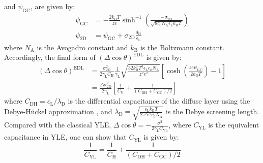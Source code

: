 and \(\psi_{\mathrm{GC}}\), are given by:
\begin{equation}
\label{eqn-psi-GC}
\begin{aligned}
  \psi_{\mathrm{GC}} &= -\frac{2k_{\mathrm{B}}T}{ze} 
                         \sinh^{-1}\left(
                         \frac{-\sigma_{\mathrm{2D}}}{\sqrt{8c_{0}N_{\mathrm{A}}\epsilon_{\mathrm{L}}k_{\mathrm{B}}T}}
                            \right) \\
  \psi_{\mathrm{2D}} &= \psi_{\mathrm{GC}} + \sigma_{\mathrm{2D}}\frac{d_{\mathrm{H}}}{\epsilon_{\mathrm{L}}}
\end{aligned}
\end{equation}
where \(N_{\mathrm{A}}\) is the Avogadro constant and \(k_{\mathrm{B}}\)
is the Boltzmann constant. Accordingly, the final form
of \((\Delta \cos \theta)^{\mathrm{EDL}}\) is given by:
\begin{equation}
\label{eqn-Delta-cos-EDL-final}
\begin{aligned}
(\Delta \cos \theta)^{\mathrm{EDL}} &= \frac{\sigma_{\mathrm{2D}}^{2}}{2\gamma_{\mathrm{L}}
                                       C_{\mathrm{H}}}\frac{1}{\gamma_{\mathrm{L}}}
                                       \sqrt{\frac{32k_{\mathrm{B}}^{3}T^{3} \epsilon_{\mathrm{L}} c_{0} 
                                       N_{\mathrm{A}}}{z^{2}e^{2}}} 
                                       \left[\cosh(\frac{z e \psi_{\mathrm{GC}}}{2k_{\mathrm{B}} T}) -1 \right]\\
                                    &= \frac{\Delta \sigma_{\mathrm{2D}}^{2}}{2\gamma_{\mathrm{L}}}
                                       \left[ \frac{1}{C_{\mathrm{H}}} + \frac{1}{(C_{\mathrm{DH}} + 
                                       C_{\mathrm{GC}})/2}\right]
\end{aligned}
\end{equation}
where \(C_{\mathrm{DH}}=\epsilon_{\mathrm{L}}/\lambda_{\mathrm{D}}\) is
the differential capacitance of the diffuse layer using the
Debye-Hückel approximation \cite{bard_electrochemical_1980}, and
\(\lambda_{\mathrm{D}}=\sqrt{\frac{\epsilon_{\mathrm{L}}k_{\mathrm{B}}T}{2z^{2}e^{2}c_{0}N_{\mathrm{A}}}}\)
is the Debye screening length. Compared with the classical YLE,
\(\Delta \cos \theta =
-\frac{\sigma^{2}}{2\gamma_{\mathrm{L}}C_{\mathrm{YL}}}\), where
\(C_{\mathrm{YL}}\) is the equivalent capacitance in YLE, one can show that \(C_{\mathrm{YL}}\)
is given by:
\begin{equation}
\label{eqn-CYL-model}
\frac{1}{C_{\mathrm{YL}}} = \frac{1}{C_{\mathrm{H}}} + \frac{1}{(C_{\mathrm{DH}} + C_{\mathrm{GC}})/2}
\end{equation}




